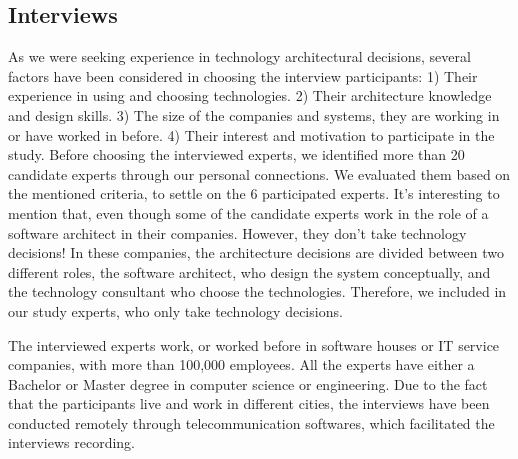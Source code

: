 \documentclass[conference]{IEEEtran}
\begin{document}
\subsection{Interviews}
\label{sec:interviews}
As we were seeking experience in technology architectural decisions, several
factors have been considered in choosing the interview participants: 1) Their
experience in using and choosing technologies. 2) Their architecture
knowledge and design skills. 3) The size of the companies and systems, they are
working in or have worked in before. 4) Their interest and motivation to
participate in the study. Before choosing the interviewed experts, we identified
more than 20 candidate experts through our personal connections. We evaluated
them based on the mentioned criteria, to settle on the 6 participated experts.
It's interesting to mention that, even though some of the candidate experts work
in the role of a software architect in their companies. However, they don't take
technology decisions! In these companies, the architecture decisions are divided
between two different roles, the software architect, who design the system
conceptually, and the technology consultant who choose the technologies.
Therefore, we included in our study experts, who only take technology decisions. 

The interviewed experts work, or worked before in software houses or IT service
companies, with more than 100,000 employees. All the experts have either a
Bachelor or Master degree in computer science or engineering. Due to the fact
that the participants live and work in different cities, the interviews have
been conducted remotely through telecommunication softwares, which facilitated
the interviews recording.
\end{document}
